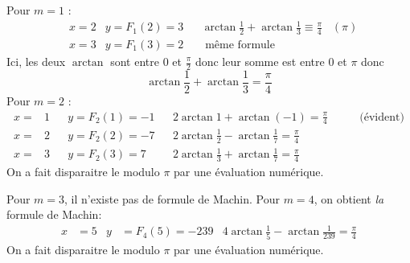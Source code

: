 \begin{enumerate}
Pour $m=1$ :
\begin{align*}
 &x=2  &y=F_1(2)=3 & & \arctan \frac{1}{2}+\arctan\frac{1}{3} \equiv \frac{\pi}{4} \hspace{10pt} (\pi)\\
 &x=3  &y=F_1(3)=2 & & \text{ même formule }
\end{align*}
Ici, les deux $\arctan$ sont entre $0$ et $\frac{\pi}{2}$ donc leur somme est entre $0$ et $\pi$ donc
\begin{displaymath}
 \arctan \frac{1}{2}+\arctan\frac{1}{3} = \frac{\pi}{4}
\end{displaymath}
Pour $m=2$ :
\begin{align*}
 x=&1 & & y = F_2(1)=-1 & & 2\arctan 1 + \arctan (-1) = \frac{\pi}{4}&\hspace{20pt}\text{ (évident)}\\
 x=&2 & & y = F_2(2)=-7 & & 2\arctan\frac{1}{2} - \arctan\frac{1}{7} = \frac{\pi}{4}& \\
 x=&3 & & y = F_2(3)=7  & & 2\arctan\frac{1}{3} + \arctan\frac{1}{7} = \frac{\pi}{4}&
\end{align*}
On a fait disparaitre le modulo $\pi$ par une évaluation numérique.
\end{enumerate}
Pour $m=3$, il n'existe pas de formule de Machin.\newline
Pour $m=4$, on obtient \emph{la} formule de Machin:
\begin{align*}
 x&=5 & y&=F_4(5)=-239 & 4\arctan\frac{1}{5} - \arctan\frac{1}{239}=\frac{\pi}{4}
\end{align*}
On a fait disparaitre le modulo $\pi$ par une évaluation numérique.

